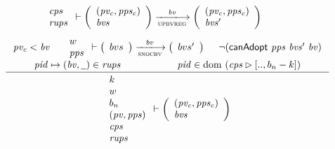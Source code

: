 \begin{figure}[htb]
\begin{equation}
{{\begin{array}{l}
          \var{cps}\\
          \var{rups}
        \end{array}
      }
      \vdash
      {
        \left(
          \begin{array}{l}
            (\var{pv_c}, \var{pps_c})\\
            \var{bvs}
          \end{array}
        \right)
      }
      \trans{upbvreg}{\var{bv}}
      {
        \left(
          \begin{array}{l}
            (\var{pv_c}, \var{pps_c})\\
            \var{bvs'}
          \end{array}
        \right)
      }
    }
  \end{equation}
  \nextdef
  \begin{equation}
    \label{eq:rule:up-no-adoption}
    \inference
    {
      \var{pv_c} < \var{bv}
      &
      {
        \begin{array}{l}
          w\\
          \var{pps}
        \end{array}
      }
      \vdash
      {
        \left(
          \begin{array}{l}
            bvs
          \end{array}
        \right)
      }
      \trans{snocbv}{bv}
      {
        \left(
          \begin{array}{l}
            bvs'
          \end{array}
        \right)
      }
      & \neg (\fun{canAdopt}~\var{pps}~\var{bvs'}~\var{bv})\\
      \var{pid} \mapsto (\var{bv}, \wcard) \in \var{rups}
      & \var{pid} \in \dom~(\var{cps} \restrictrange [.., b_n - k])
    }
    {
      {
        \begin{array}{l}
          k\\
          w\\
          b_n\\
          (\var{pv}, \var{pps})\\
          \var{cps}\\
          \var{rups}
        \end{array}
      }
      \vdash
      {
        \left(
          \begin{array}{l}
            (\var{pv_c}, \var{pps_c})\\
            \var{bvs}
          \end{array}
        \right)
}}
\end{equation}
\end{figure}
